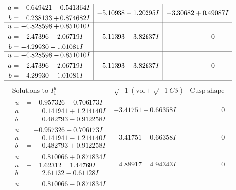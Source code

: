 \documentclass[1p]{elsarticle_modified}
\theoremstyle{definition}
\newcommand{\I}{\sqrt{-1}}
\begin{document}
$$\begin{array}{c|c|c}
\begin{aligned}
a &= -0.649421 - 0.541364 I \\
b &= \phantom{-}0.238133 + 0.874682 I\end{aligned}
 & -5.10938 - 1.20295 I & -3.30682 + 0.49087 I \\ \hline\begin{aligned}
u &= -0.828598 + 0.851010 I \\
a &= \phantom{-}2.47396 - 2.06719 I \\
b &= -4.29930 - 1.01081 I\end{aligned}
 & -5.11393 + 3.82637 I & \phantom{-0.000000 } 0 \\ \hline\begin{aligned}
u &= -0.828598 - 0.851010 I \\
a &= \phantom{-}2.47396 + 2.06719 I \\
b &= -4.29930 + 1.01081 I\end{aligned}
 & -5.11393 - 3.82637 I & \phantom{-0.000000 } 0\\
 \hline 
 \end{array}$$\newpage$$\begin{array}{c|c|c}  
\text{Solutions to }I^u_{1}& \I (\text{vol} + \sqrt{-1}CS) & \text{Cusp shape}\\
 \hline 
\begin{aligned}
u &= -0.957326 + 0.706173 I \\
a &= \phantom{-}0.141941 + 1.214140 I \\
b &= \phantom{-}0.482793 - 0.912258 I\end{aligned}
 & -3.41751 + 0.66358 I & \phantom{-0.000000 } 0 \\ \hline\begin{aligned}
u &= -0.957326 - 0.706173 I \\
a &= \phantom{-}0.141941 - 1.214140 I \\
b &= \phantom{-}0.482793 + 0.912258 I\end{aligned}
 & -3.41751 - 0.66358 I & \phantom{-0.000000 } 0 \\ \hline\begin{aligned}
u &= \phantom{-}0.810066 + 0.871834 I \\
a &= -1.62312 - 1.44769 I \\
b &= \phantom{-}2.61132 - 0.61128 I\end{aligned}
 & -4.88917 - 4.94343 I & \phantom{-0.000000 } 0 \\ \hline\begin{aligned}
u &= \phantom{-}0.810066 - 0.871834 I \\

\end{aligned}
\end{array}$$
\end{document}
